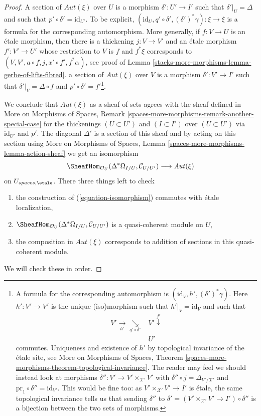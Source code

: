 \begin{proof}
\medskip\noindent
A section of $\mathit{Aut}(\xi)$ over $U$ is a morphism $\delta' : U' \to I'$
such that $\delta'|_U = \Delta$ and such that
$p' \circ \delta' = \text{id}_{U'}$. To be explicit,
$(\text{id}_U, q' \circ \delta', (\delta')^*\gamma) : \xi \to \xi$
is a formula for the corresponding automorphism.
More generally, if
$f : V \to U$ is an \'etale morphism, then there is a thickening
$j : V \to V'$ and an \'etale morphism
$f' : V' \to U'$ whose restriction to $V$ is $f$ and $f^*\xi$
corresponds to $(V, V', a \circ f, j, x' \circ f', f^*\alpha)$, see proof of
Lemma \ref{stacks-more-morphisms-lemma-gerbe-of-lifts-fibred}.
 a section of $\mathit{Aut}(\xi)$ over $V$ is a morphism
$\delta' : V' \to I'$
such that $\delta'|_V = \Delta \circ f$
and $p' \circ \delta' = f'$\footnote{A formula for the corresponding
automorphism is $(\text{id}_V, h', (\delta')^*\gamma)$.
Here $h' : V' \to V'$ is the unique (iso)morphism such that
$h'|_V = \text{id}_V$ and such that
$$
\begin{array}{cc}V' \underset{h'}{\longrightarrow}\underset{q' \circ \delta'}{\searrow} & V' \overset{f'}{\downarrow} \\  & U'\end{array}
$$
commutes. Uniqueness and existence of $h'$ by topological invariance of
the \'etale site, see More on Morphisms of Spaces,
Theorem \ref{spaces-more-morphisms-theorem-topological-invariance}.
The reader may feel we should instead look at morphisms
$\delta'' : V' \to V' \times_{\mathcal{X}'} V'$ with
$\delta'' \circ j = \Delta_{V'/\mathcal{X}'}$ and
$\text{pr}_1 \circ \delta'' = \text{id}_{V'}$.
This would be fine too: as $V' \times_{\mathcal{X}'} V' \to I'$ is \'etale,
the same topological invariance tells us that sending
$\delta''$ to $\delta' = (V' \times_{\mathcal{X}'} V' \to I') \circ \delta''$
is a bijection between the two
sets of morphisms.}.

\medskip\noindent
We conclude that $\mathit{Aut}(\xi)$ as a sheaf of sets agrees with
the sheaf defined in
More on Morphisms of Spaces, Remark
\ref{spaces-more-morphisms-remark-another-special-case}
for the thickenings $(U \subset U')$ and $(I \subset I')$ over
$(U \subset U')$ via $\text{id}_{U'}$ and $p'$.
The diagonal $\Delta'$ is a section of this sheaf and by
acting on this section using More on Morphisms of Spaces, Lemma
\ref{spaces-more-morphisms-lemma-action-sheaf}
we get an isomorphism
\begin{equation}
\label{equation-isomorphism}
\SheafHom_{\mathcal{O}_U}(\Delta^*\Omega_{I/U}, \mathcal{C}_{U/U'})
\longrightarrow
\mathit{Aut}(\xi)
\end{equation}
on $U_{spaces, \etale}$. There three things left to check
\begin{enumerate}
\item the construction of (\ref{equation-isomorphism})
commutes with \'etale localization,
\item $\SheafHom_{\mathcal{O}_U}(\Delta^*\Omega_{I/U}, \mathcal{C}_{U/U'})$
is a quasi-coherent module on $U$,
\item the composition in $\mathit{Aut}(\xi)$ corresponds
to addition of sections in this quasi-coherent module.
\end{enumerate}
We will check these in order.


\end{proof}
